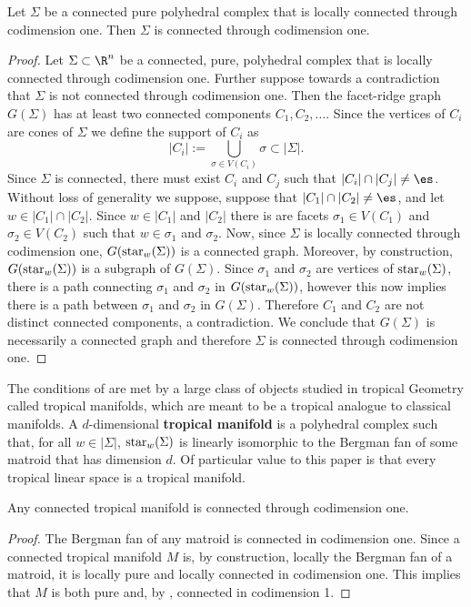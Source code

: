 \begin{proposition}\label{prop:connectedCodim1}
Let $\Sigma$ be a connected pure polyhedral complex that is locally connected through codimension one. Then $\Sigma$ is connected through codimension one.
\end{proposition}
\begin{proof}
    Let $\Sigma\subset \R^n$ be a connected, pure, polyhedral complex that is locally connected through codimension one. Further suppose towards a contradiction that $\Sigma$ is not connected through codimension one. Then the facet-ridge graph $G(\Sigma)$ has at least two connected components $C_1, C_2,\dots$. Since the vertices of $C_i$ are cones of $\Sigma$ we define the support of $C_i$ as
    $$|C_i|:= \bigcup_{\sigma\in V(C_i)} \sigma\subset |\Sigma|.$$
    Since $\Sigma$ is connected, there must exist $C_i$ and $C_j$ such that $|C_i|\cap |C_j|\neq \es$. Without loss of generality we suppose, suppose that $|C_1|\cap |C_2|\neq \es$, and let $w\in |C_1|\cap |C_2|$. Since $w\in |C_1|$ and $|C_2|$ there is are facets  $\sigma_1\in V(C_1)$ and $\sigma_2\in V(C_2)$ such that $w\in \sigma_1$ and $\sigma_2$. Now, since $\Sigma$ is locally connected through codimension one, $G(\operatorname{star}_w(\Sigma))$ is a connected graph. Moreover, by construction, $G(\operatorname{star}_w(\Sigma))$ is a subgraph of $G(\Sigma)$. Since $\sigma_1$ and $\sigma_2$ are vertices of $\operatorname{star}_w(\Sigma)$, there is a path connecting $\sigma_1$ and $\sigma_2$ in $G(\operatorname{star}_w(\Sigma))$, however this now implies there is a path between $\sigma_1$ and $\sigma_2$ in $G(\Sigma)$. Therefore $C_1$ and $C_2$ are not distinct connected components, a contradiction. We conclude that $G(\Sigma)$ is necessarily a connected graph and therefore $\Sigma$ is connected through codimension one.
\end{proof}

The conditions of  are met by a large class of objects studied in tropical Geometry called tropical manifolds, which are meant to be a tropical analogue to classical manifolds. A $d$-dimensional \textbf{tropical manifold} is a polyhedral complex such that, for all $w\in |\Sigma|$, $\operatorname{star}_w(\Sigma)$ is linearly isomorphic to the Bergman fan of some matroid that has dimension $d$. Of particular value to this paper is that every tropical linear space is a tropical manifold.

\begin{corollary}\label{cor:connectedCodim1}
    Any connected tropical manifold is connected through codimension one.
\end{corollary}
\begin{proof}
    The Bergman fan of any matroid is connected in codimension one. Since a connected tropical manifold $M$ is, by construction, locally the Bergman fan of a matroid, it is locally pure and locally connected in codimension one. This implies that $M$ is both pure and, by , connected in codimension 1.
\end{proof}

